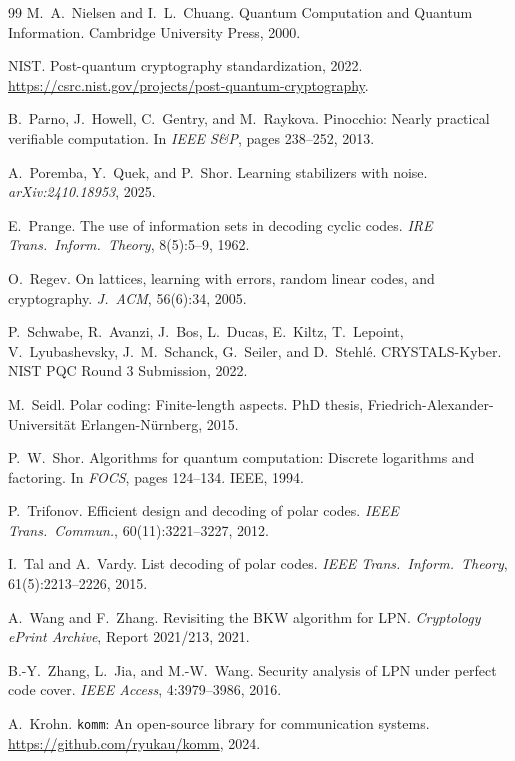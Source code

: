 \documentclass[11pt,a4paper]{article}
\theoremstyle{plain}
\theoremstyle{definition}
\begin{document}
\begin{thebibliography}{99}
M.~A.~Nielsen and I.~L.~Chuang.
Quantum Computation and Quantum Information.
Cambridge University Press, 2000.

NIST.
Post-quantum cryptography standardization, 2022.
\url{https://csrc.nist.gov/projects/post-quantum-cryptography}.

B.~Parno, J.~Howell, C.~Gentry, and M.~Raykova.
Pinocchio: Nearly practical verifiable computation.
In \emph{IEEE S\&P}, pages 238--252, 2013.

A.~Poremba, Y.~Quek, and P.~Shor.
Learning stabilizers with noise.
\emph{arXiv:2410.18953}, 2025.

E.~Prange.
The use of information sets in decoding cyclic codes.
\emph{IRE Trans.\ Inform.\ Theory}, 8(5):5--9, 1962.

O.~Regev.
On lattices, learning with errors, random linear codes, and cryptography.
\emph{J.\ ACM}, 56(6):34, 2005.

P.~Schwabe, R.~Avanzi, J.~Bos, L.~Ducas, E.~Kiltz, T.~Lepoint, V.~Lyubashevsky, J.~M.~Schanck, G.~Seiler, and D.~Stehl\'e.
CRYSTALS-Kyber.
NIST PQC Round 3 Submission, 2022.

M.~Seidl.
Polar coding: Finite-length aspects.
PhD thesis, Friedrich-Alexander-Universit\"at Erlangen-N\"urnberg, 2015.

P.~W.~Shor.
Algorithms for quantum computation: Discrete logarithms and factoring.
In \emph{FOCS}, pages 124--134. IEEE, 1994.

P.~Trifonov.
Efficient design and decoding of polar codes.
\emph{IEEE Trans.\ Commun.}, 60(11):3221--3227, 2012.

I.~Tal and A.~Vardy.
List decoding of polar codes.
\emph{IEEE Trans.\ Inform.\ Theory}, 61(5):2213--2226, 2015.

A.~Wang and F.~Zhang.
Revisiting the BKW algorithm for LPN.
\emph{Cryptology ePrint Archive}, Report 2021/213, 2021.

B.-Y.~Zhang, L.~Jia, and M.-W.~Wang.
Security analysis of LPN under perfect code cover.
\emph{IEEE Access}, 4:3979--3986, 2016.

A.~Krohn.
\texttt{komm}: An open-source library for communication systems.
\url{https://github.com/ryukau/komm}, 2024.

\end{thebibliography}
\end{document}
